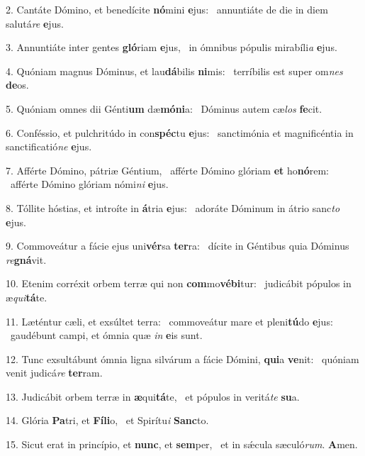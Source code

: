 2. Cantáte Dómino, et benedícite \textbf{nó}mini \textbf{e}jus: \ast\  annuntiáte de die in diem salutá\textit{re} \textbf{e}jus.\

3. Annuntiáte inter gentes \textbf{gló}riam \textbf{e}jus, \ast\  in ómnibus pópulis mirabíli\textit{a} \textbf{e}jus.\

4. Quóniam magnus Dóminus, et lau\textbf{dá}bilis \textbf{ni}mis: \ast\  terríbilis est super om\textit{nes} \textbf{de}os.\

5. Quóniam omnes dii Génti\textbf{um} dæ\textbf{mó}\textbf{ni}a: \ast\  Dóminus autem cæ\textit{los} \textbf{fe}cit.\

6. Conféssio, et pulchritúdo in con\textbf{spéc}tu \textbf{e}jus: \ast\  sanctimónia et magnificéntia in sanctificatió\textit{ne} \textbf{e}jus.\

7. Afférte Dómino, pátriæ Géntium, \dag\  afférte Dómino glóriam \textbf{et} ho\textbf{nó}rem: \ast\  afférte Dómino glóriam nómi\textit{ni} \textbf{e}jus.\

8. Tóllite hóstias, et introíte in \textbf{á}tria \textbf{e}jus: \ast\  adoráte Dóminum in átrio sanc\textit{to} \textbf{e}jus.\

9. Commoveátur a fácie ejus uni\textbf{vér}sa \textbf{ter}ra: \ast\  dícite in Géntibus quia Dóminus \textit{re}\textbf{gná}vit.\

10. Etenim corréxit orbem terræ qui non \textbf{com}mo\textbf{vé}\textbf{bi}tur: \ast\  judicábit pópulos in æ\textit{qui}\textbf{tá}te.\

11. Læténtur cæli, et exsúltet terra: \dag\  commoveátur mare et pleni\textbf{tú}do \textbf{e}jus: \ast\  gaudébunt campi, et ómnia quæ \textit{in} \textbf{e}is sunt.\

12. Tunc exsultábunt ómnia ligna silvárum a fácie Dómini, \textbf{qui}a \textbf{ve}nit: \ast\  quóniam venit judicá\textit{re} \textbf{ter}ram.\

13. Judicábit orbem terræ in \textbf{æ}qui\textbf{tá}te, \ast\  et pópulos in veritá\textit{te} \textbf{su}a.\

14. Glória \textbf{Pa}tri, et \textbf{Fí}\textbf{li}o, \ast\  et Spirítu\textit{i} \textbf{Sanc}to.\

15. Sicut erat in princípio, et \textbf{nunc}, et \textbf{sem}per, \ast\  et in sǽcula sæculó\textit{rum}. \textbf{A}men.\

